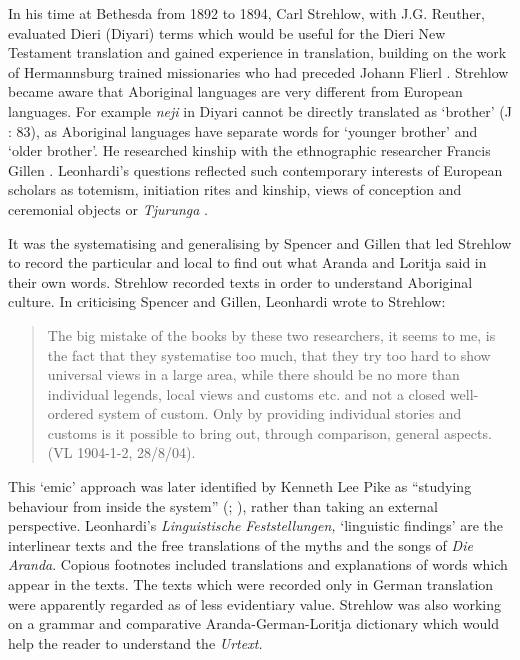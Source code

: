 \documentclass[output=paper]{langsci/langscibook}
\begin{document}
In his time at Bethesda from 1892 to 1894, Carl Strehlow, with J.G. Reuther, evaluated Dieri (Diyari) terms which would be useful for the Dieri New Testament translation and gained experience in translation, building on the work of Hermannsburg trained missionaries who had preceded Johann Flierl \citep{wendt_was_2001}. Strehlow became aware that Aboriginal languages are very different from European languages. For example \textit{neji} in Diyari cannot be directly translated as ‘brother’ (J \citealt[83]{Strehlow2004}: 83), as Aboriginal languages have separate words for ‘younger brother’ and ‘older brother’. He researched kinship with the ethnographic researcher Francis Gillen \citep{mulvaney_my_1997}. Leonhardi’s questions reflected such contemporary interests of European scholars as totemism, initiation rites and kinship, views of conception and ceremonial objects or \textit{Tjurunga} \citep{schmidt_stellung_1908}. 

It was the systematising and generalising by Spencer and Gillen that led Strehlow to record the particular and local to find out what Aranda and Loritja said in their own words. Strehlow recorded texts in order to understand Aboriginal culture. In criticising Spencer and Gillen, Leonhardi wrote to Strehlow:

\begin{quote}
    The big mistake of the books by these two researchers, it seems to me, is the fact that they systematise too much, that they try too hard to show universal views in a large area, while there should be no more than individual legends, local views and customs etc. and not a closed well-ordered system of custom. Only by providing individual stories and customs is it possible to bring out, through comparison, general aspects. (VL 1904-1-2, 28/8/04).
\end{quote}

This ‘emic’ approach was later identified by Kenneth Lee Pike as “studying behaviour from inside the system” (\citealt[37]{pike_language_1967}; \citealt[542]{bolinger_aspects_1975}), rather than taking an external perspective. Leonhardi’s \textit{Linguistische} \textit{Feststellungen,} ‘linguistic findings’ are the interlinear texts and the free translations of the myths and the songs of \textit{Die} \textit{Aranda}. Copious footnotes included translations and explanations of words which appear in the texts. The texts which were recorded only in German translation were apparently regarded as of less evidentiary value. Strehlow was also working on a grammar and comparative Aranda-German-Loritja dictionary which would help the reader to understand the \textit{Urtext.} 
\end{document}
